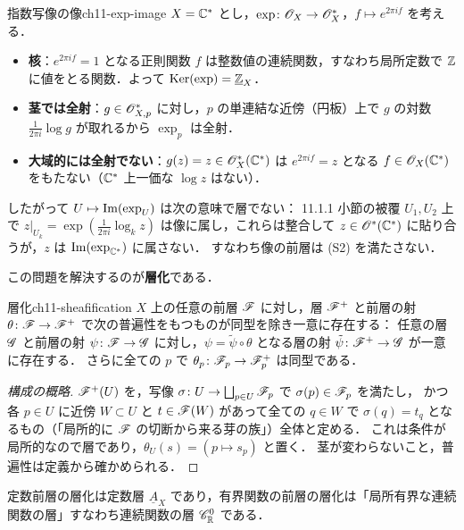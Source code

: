 \begin{myex}{指数写像の像}{ch11-exp-image}
$X=\mathbb{C}^*$ とし，$\exp\colon\mathscr{O}_X\to\mathscr{O}_X^*$，$f\mapsto e^{2\pi i f}$ を考える．
\begin{itemize}
  \item \textbf{核}：$e^{2\pi i f}=1$ となる正則関数 $f$ は整数値の連続関数，すなわち局所定数で $\mathbb{Z}$ に値をとる関数．よって $\operatorname{Ker}(\exp)=\underline{\mathbb{Z}}_X$．
  \item \textbf{茎では全射}：$g\in\mathscr{O}^*_{X,p}$ に対し，$p$ の単連結な近傍（円板）上で $g$ の対数 $\frac{1}{2\pi i}\log g$ が取れるから $\exp_p$ は全射．
  \item \textbf{大域的には全射でない}：$g(z)=z\in\mathscr{O}_X^*(\mathbb{C}^*)$ は $e^{2\pi i f}=z$ となる $f\in\mathscr{O}_X(\mathbb{C}^*)$ をもたない（$\mathbb{C}^*$ 上一価な $\log z$ はない）．
\end{itemize}
したがって $U\mapsto\operatorname{Im}(\exp_U)$ は次の意味で層でない：
11.1.1 小節の被覆 $U_1,U_2$ 上で $z|_{U_k}=\exp(\frac{1}{2\pi i}\log_k z)$ は像に属し，これらは整合して $z\in\mathscr{O}^*(\mathbb{C}^*)$ に貼り合うが，$z$ は $\operatorname{Im}(\exp_{\mathbb{C}^*})$ に属さない．
すなわち像の前層は (S2) を満たさない．
\end{myex}

この問題を解決するのが\textbf{層化}である．

\begin{mythm}{層化}{ch11-sheafification}
$X$ 上の任意の前層 $\mathscr{F}$ に対し，層 $\mathscr{F}^+$ と前層の射 $\theta\colon\mathscr{F}\to\mathscr{F}^+$ で次の普遍性をもつものが同型を除き一意に存在する：
任意の層 $\mathscr{G}$ と前層の射 $\psi\colon\mathscr{F}\to\mathscr{G}$ に対し，$\psi=\tilde\psi\circ\theta$ となる層の射 $\tilde\psi\colon\mathscr{F}^+\to\mathscr{G}$ が一意に存在する．
さらに全ての $p$ で $\theta_p\colon\mathscr{F}_p\to\mathscr{F}^+_p$ は同型である．
\end{mythm}
\begin{proof}[構成の概略]
$\mathscr{F}^+(U)$ を，写像 $\sigma\colon U\to\bigsqcup_{p\in U}\mathscr{F}_p$ で $\sigma(p)\in\mathscr{F}_p$ を満たし，
かつ各 $p\in U$ に近傍 $W\subset U$ と $t\in\mathscr{F}(W)$ があって全ての $q\in W$ で $\sigma(q)=t_q$ となるもの（「局所的に $\mathscr{F}$ の切断から来る芽の族」）全体と定める．
これは条件が局所的なので層であり，$\theta_U(s)=(p\mapsto s_p)$ と置く．
茎が変わらないこと，普遍性は定義から確かめられる．
\end{proof}

定数前層の層化は定数層 $\underline{A}_X$ であり，有界関数の前層の層化は「局所有界な連続関数の層」すなわち連続関数の層 $\mathscr{C}^0_{\mathbb{R}}$ である．

